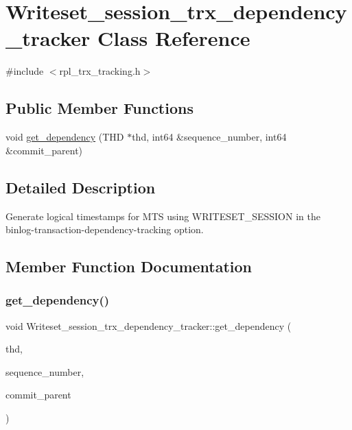 \hypertarget{classWriteset__session__trx__dependency__tracker}{}\section{Writeset\+\_\+session\+\_\+trx\+\_\+dependency\+\_\+tracker Class Reference}
\label{classWriteset__session__trx__dependency__tracker}


{\ttfamily \#include $<$rpl\+\_\+trx\+\_\+tracking.\+h$>$}

\subsection*{Public Member Functions}
\begin{DoxyCompactItemize}
\item 
void \mbox{\hyperlink{classWriteset__session__trx__dependency__tracker_ae0f907be7f3b1a055026fadd9429b53b}{get\+\_\+dependency}} (T\+HD $\ast$thd, int64 \&sequence\+\_\+number, int64 \&commit\+\_\+parent)
\end{DoxyCompactItemize}


\subsection{Detailed Description}
Generate logical timestamps for M\+TS using W\+R\+I\+T\+E\+S\+E\+T\+\_\+\+S\+E\+S\+S\+I\+ON in the binlog-\/transaction-\/dependency-\/tracking option. 

\subsection{Member Function Documentation}
\mbox{\label{classWriteset__session__trx__dependency__tracker_ae0f907be7f3b1a055026fadd9429b53b}} 
\subsubsection{\texorpdfstring{get\+\_\+dependency()}{get\_dependency()}}
{\footnotesize\ttfamily void Writeset\+\_\+session\+\_\+trx\+\_\+dependency\+\_\+tracker\+::get\+\_\+dependency (\begin{DoxyParamCaption}\item[{T\+HD $\ast$}]{thd,  }\item[{int64 \&}]{sequence\+\_\+number,  }\item[{int64 \&}]{commit\+\_\+parent }\end{DoxyParamCaption})}

